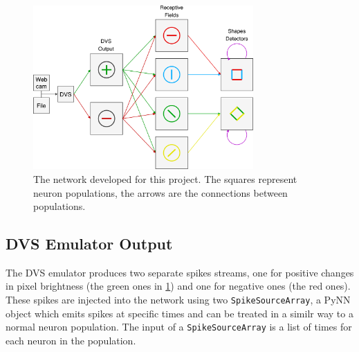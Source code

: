 \begin{figure}[ht]
\centering
\includegraphics[width=0.75\textwidth]{images/development/network.png}
\caption[Network Overview]{The network developed for this project. The squares represent neuron populations, the arrows are the connections between populations.}
\label{fig:network}
\end{figure}


\subsection{DVS Emulator Output}
The DVS emulator produces two separate spikes streams, one for positive changes in pixel brightness (the green ones in \cref{fig:network}) and one for negative ones (the red ones). These spikes are injected into the network using two \texttt{SpikeSourceArray}, a PyNN object which emits spikes at specific times and can be treated in a similr way to a normal neuron population. The input of a \texttt{SpikeSourceArray} is a list of times for each neuron in the population. 

